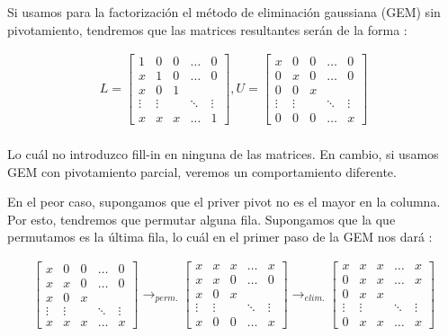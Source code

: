 \documentclass{article}
\begin{document}
\begin{enumerate}
Si usamos para la factorizaci\'on el m\'etodo de eliminaci\'on gaussiana (GEM) sin pivotamiento, tendremos que las matrices resultantes ser\'an de la forma :

\begin{gather*}
L = 
	\begin{bmatrix}
		1 & 0 & 0 & \hdots & 0 \\
		x & 1 & 0 & \hdots & 0 \\
		x & 0 & 1 \\
		\vdots & \vdots && \ddots & \vdots \\
		x & x & x & \hdots & 1
	\end{bmatrix},
U = 
	\begin{bmatrix}
		x & 0 & 0 & \hdots & 0 \\
		0 & x & 0 & \hdots & 0 \\
		0 & 0 & x \\
		\vdots & \vdots && \ddots & \vdots \\
		0 & 0 & 0 & \hdots & x
	\end{bmatrix}
\end{gather*}
\\
Lo cu\'al no introduzco fill-in en ninguna de las matrices. En cambio, si usamos GEM con pivotamiento parcial, veremos un comportamiento diferente.

En el peor caso, supongamos que el priver pivot no es el mayor en la columna. Por esto, tendremos que permutar alguna fila. Supongamos que la que permutamos es la \'ultima fila, lo cu\'al en el primer paso de la GEM nos dar\'a :

\begin{gather*}
\begin{bmatrix}
	x & 0 & 0 & \hdots & 0 \\
	x & x & 0 & \hdots & 0 \\
	x & 0 & x \\
	\vdots & \vdots && \ddots & \vdots \\
	x & x & x & \hdots & x
\end{bmatrix} 
\rightarrow_{perm.}
\begin{bmatrix}
	x & x & x & \hdots & x \\
	x & x & 0 & \hdots & 0 \\
	x & 0 & x \\
	\vdots & \vdots && \ddots & \vdots \\
	x & 0 & 0 & \hdots & x
\end{bmatrix} 
\rightarrow_{elim.}
\begin{bmatrix}
	x & x & x & \hdots & x \\
	0 & x & x & \hdots & x \\
	0 & x & x \\
	\vdots & \vdots && \ddots & \vdots \\
	0 & x & x & \hdots & x
\end{bmatrix} 
\end{gather*}


\end{enumerate}
\end{document}
